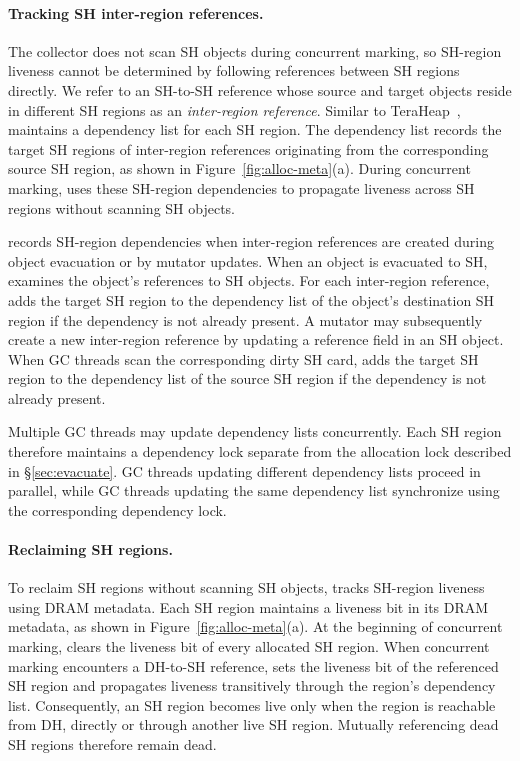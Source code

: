 \paragraph{\textbf{Tracking SH inter-region references.}}
The collector does not scan SH objects during concurrent marking, so SH-region liveness cannot be determined by following references between SH regions directly.
We refer to an SH-to-SH reference whose source and target objects reside in different SH regions as an \emph{inter-region reference}.
Similar to TeraHeap~\cite{teraheap}, \chipperName{} maintains a dependency list for each SH region.
The dependency list records the target SH regions of inter-region references originating from the corresponding source SH region, as shown in Figure~\ref{fig:alloc-meta}(a).
During concurrent marking, \chipperName{} uses these SH-region dependencies to propagate liveness across SH regions without scanning SH objects.

\chipperName{} records SH-region dependencies when inter-region references are created during object evacuation or by mutator updates.
When an object is evacuated to SH, \chipperName{} examines the object's references to SH objects.
For each inter-region reference, \chipperName{} adds the target SH region to the dependency list of the object's destination SH region if the dependency is not already present.
A mutator may subsequently create a new inter-region reference by updating a reference field in an SH object.
When GC threads scan the corresponding dirty SH card, \chipperName{} adds the target SH region to the dependency list of the source SH region if the dependency is not already present.

Multiple GC threads may update dependency lists concurrently.
Each SH region therefore maintains a dependency lock separate from the allocation lock described in \S\ref{sec:evacuate}.
GC threads updating different dependency lists proceed in parallel, while GC threads updating the same dependency list synchronize using the corresponding dependency lock.

\paragraph{\textbf{Reclaiming SH regions.}}
To reclaim SH regions without scanning SH objects, \chipperName{} tracks SH-region liveness using DRAM metadata.
Each SH region maintains a liveness bit in its DRAM metadata, as shown in Figure~\ref{fig:alloc-meta}(a).
At the beginning of concurrent marking, \chipperName{} clears the liveness bit of every allocated SH region.
When concurrent marking encounters a DH-to-SH reference, \chipperName{} sets the liveness bit of the referenced SH region and propagates liveness transitively through the region's dependency list.
Consequently, an SH region becomes live only when the region is reachable from DH, directly or through another live SH region.
Mutually referencing dead SH regions therefore remain dead.

